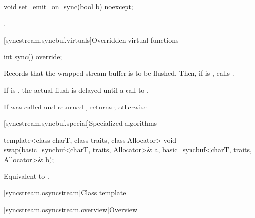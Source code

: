 %
\begin{itemdecl}
void set_emit_on_sync(bool b) noexcept;
\end{itemdecl}

\begin{itemdescr}
\pnum
\effects
{}.
\end{itemdescr}

[syncstream.syncbuf.virtuals]{Overridden virtual functions}

%
\begin{itemdecl}
int sync() override;
\end{itemdecl}

\begin{itemdescr}
\pnum
\effects
Records that the wrapped stream buffer is to be flushed.
Then, if  is , calls .
\begin{note}
If  is ,
the actual flush is delayed until a call to .
\end{note}

\pnum
\returns
If  was called and returned ,
returns ; otherwise .
\end{itemdescr}

[syncstream.syncbuf.special]{Specialized algorithms}

%
\begin{itemdecl}
template<class charT, class traits, class Allocator>
  void swap(basic_syncbuf<charT, traits, Allocator>& a,
            basic_syncbuf<charT, traits, Allocator>& b);
\end{itemdecl}

\begin{itemdescr}
\pnum
\effects
Equivalent to .
\end{itemdescr}

[syncstream.osyncstream]{Class template }

[syncstream.osyncstream.overview]{Overview}

